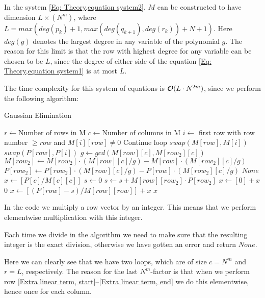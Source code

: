 In the system \ref{Eq: Theory,equation system2}, $M$ can be constructed to have dimension $L\times (N^m)$, where $L=max(deg(p_k)+1,max(deg(q_{k+1}),deg(r_k))+N+1)$. Here $deg(g)$ denotes the largest degree in any variable of the polynomial $g$. The reason for this limit is that the row with highest degree for any variable can be chosen to be $L$, since the degree of either side of the equation \ref{Eq: Theory,equation system1} is at most $L$.

The time complexity for this system of equations is $\mathcal{O}(L\cdot N^{2m})$, since we perform the following algorithm:
\begin{algorithm}[H]
  \caption{Gaussian Elimination}
  \begin{algorithmic}[1]
      \State $r\gets \text{Number of rows in M}$
      \State $c\gets \text{Number of columns in M}$
        \State $i\gets $ first row with row number $\geq row $ and $M[i][row]\neq 0$
          \State Continue loop
        \EndIf
        \State $swap(M[row],M[i])$ \label{Extra linear term, start}
        \State $swap(P[row],P[i])$
          \State $g\gets gcd(M[row][c],M[row_2][c])$
          \State $M[row_2] \gets M[row_2]\cdot (M[row][c]/g) - M[row]\cdot (M[row_2][c]/g)$
          \State $P[row_2] \gets P[row_2]\cdot (M[row][c]/g) - P[row]\cdot (M[row_2][c]/g)$ \label{Extra linear term, end}
        \EndFor
      \EndFor
          \State \Return $None$
        \EndIf
      \EndFor
      \State $x\gets [P[c]/M[c][c]]$
        \State $s\gets 0$
          \State $s\gets s + M[row][row_2]\cdot P[row_2]$
        \EndFor
            \State $x\gets [0] + x$
          \Else
            \State \Return $0$
          \EndIf
        \Else
          \State $x\gets [(P[row]-s)/M[row][row]] + x$
        \EndIf
      \EndFor
      \State \Return $x$
    \EndProcedure
  \end{algorithmic}
\end{algorithm}
\begin{remark}
  In the code we multiply a row vector by an integer. This means that we perform elementwise multiplication with this integer.
\end{remark}
\begin{remark}
  Each time we divide in the algorithm we need to make sure that the resulting integer is the exact division, otherwise we have gotten an error and return $None$.
\end{remark}
Here we can clearly see that we have two loops, which are of size $c=N^m$ and $r=L$, respectively. The reason for the last $N^m$-factor is that when we perform row \ref{Extra linear term, start}--\ref{Extra linear term, end} we do this elementwise, hence once for each column.

